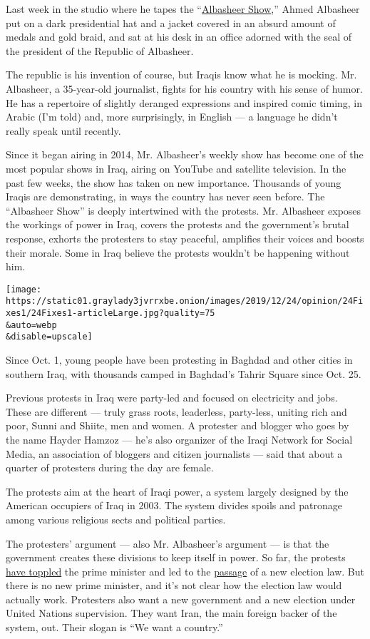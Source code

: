 Last week in the studio where he tapes the
``\href{https://www.youtube.com/channel/UCjxrFnMg_scE7fkw_Ip0_yA}{Albasheer
Show},'' Ahmed Albasheer put on a dark presidential hat and a jacket
covered in an absurd amount of medals and gold braid, and sat at his
desk in an office adorned with the seal of the president of the Republic
of Albasheer.

The republic is his invention of course, but Iraqis know what he is
mocking. Mr. Albasheer, a 35-year-old journalist, fights for his country
with his sense of humor. He has a repertoire of slightly deranged
expressions and inspired comic timing, in Arabic (I'm told) and, more
surprisingly, in English --- a language he didn't really speak until
recently.

Since it began airing in 2014, Mr. Albasheer's weekly show has become
one of the most popular shows in Iraq, airing on YouTube and satellite
television. In the past few weeks, the show has taken on new importance.
Thousands of young Iraqis are demonstrating, in ways the country has
never seen before. The ``Albasheer Show'' is deeply intertwined with the
protests. Mr. Albasheer exposes the workings of power in Iraq, covers
the protests and the government's brutal response, exhorts the
protesters to stay peaceful, amplifies their voices and boosts their
morale. Some in Iraq believe the protests wouldn't be happening without
him.

\texttt{[image: https://static01.graylady3jvrrxbe.onion/images/2019/12/24/opinion/24Fixes1/24Fixes1-articleLarge.jpg?quality=75\\\&auto=webp\\\&disable=upscale]}

Since Oct. 1, young people have been protesting in Baghdad and other
cities in southern Iraq, with thousands camped in Baghdad's Tahrir
Square since Oct. 25.

Previous protests in Iraq were party-led and focused on electricity and
jobs. These are different --- truly grass roots, leaderless, party-less,
uniting rich and poor, Sunni and Shiite, men and women. A protester and
blogger who goes by the name Hayder Hamzoz --- he's also organizer of
the Iraqi Network for Social Media, an association of bloggers and
citizen journalists --- said that about a quarter of protesters during
the day are female.

The protests aim at the heart of Iraqi power, a system largely designed
by the American occupiers of Iraq in 2003. The system divides spoils and
patronage among various religious sects and political parties.

The protesters' argument --- also Mr. Albasheer's argument --- is that
the government creates these divisions to keep itself in power. So far,
the protests
\href{https://www.nytimes3xbfgragh.onion/2019/11/29/world/middleeast/iraq-prime-minister-mahdi-resign.html}{have
toppled} the prime minister and led to the
\href{https://www.nytimes3xbfgragh.onion/2019/12/24/world/middleeast/iraq-election-law.html}{passage}
of a new election law. But there is no new prime minister, and it's not
clear how the election law would actually work. Protesters also want a
new government and a new election under United Nations supervision. They
want Iran, the main foreign backer of the system, out. Their slogan is
``We want a country.''

